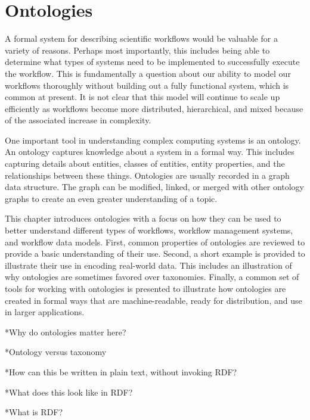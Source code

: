 \chapter{Ontologies} \label{ch:ontologies}


A formal system for describing scientific workflows would be valuable for a
variety of reasons. Perhaps most importantly, this includes being able to
determine what types of systems need to be implemented to successfully execute
the workflow. This is fundamentally a question about our ability to model our
workflows thoroughly without building out a fully functional system, which is
common at present. It is not clear that this model will continue to scale up
efficiently as workflows become more distributed, hierarchical, and mixed
because of the associated increase in complexity. 

One important tool in understanding complex computing systems is an ontology.
An ontology captures knowledge about a system in a formal way. This includes
capturing details about entities, classes of entities, entity properties, and
the relationships between these things. Ontologies are usually recorded in a
graph data structure. The graph can be modified, linked, or merged with other
ontology graphs to create an even greater understanding of a topic.

This chapter introduces ontologies with a focus on how they can be used to
better understand different types of workflows, workflow management systems,
and workflow data models. First, common properties of ontologies are reviewed to
provide a basic understanding of their use. Second, a short example is provided
to illustrate their use in encoding real-world data. This includes an
illustration of why ontologies are sometimes favored over taxonomies. Finally, a
common set of tools for working with ontologies is presented to illustrate how
ontologies are created in formal ways that are machine-readable, ready for
distribution, and use in larger applications.

*Why do ontologies matter here?

*Ontology versus taxonomy

*How can this be written in plain text, without invoking RDF?

*What does this look like in RDF?

*What is RDF?

